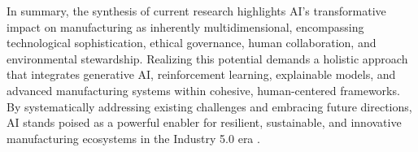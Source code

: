 \documentclass[sigconf]{acmart}
\begin{document}
In summary, the synthesis of current research highlights AI’s transformative impact on manufacturing as inherently multidimensional, encompassing technological sophistication, ethical governance, human collaboration, and environmental stewardship. Realizing this potential demands a holistic approach that integrates generative AI, reinforcement learning, explainable models, and advanced manufacturing systems within cohesive, human-centered frameworks. By systematically addressing existing challenges and embracing future directions, AI stands poised as a powerful enabler for resilient, sustainable, and innovative manufacturing ecosystems in the Industry 5.0 era \cite{ref1,ref2,ref3,ref4,ref5}.



\end{document}
